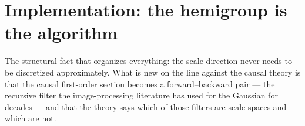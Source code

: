 %
%
%
%
%
%
%

\chapter{Implementation: the hemigroup is the algorithm}
\label{ch:implementation}

The structural fact that organizes everything: the scale direction never needs to be
discretized approximately. What is new on the line against the causal theory is that the
causal first-order section becomes a forward--backward pair --- the recursive filter the
image-processing literature has used for the Gaussian for decades --- and that the theory says
which of those filters are scale spaces and which are not.

